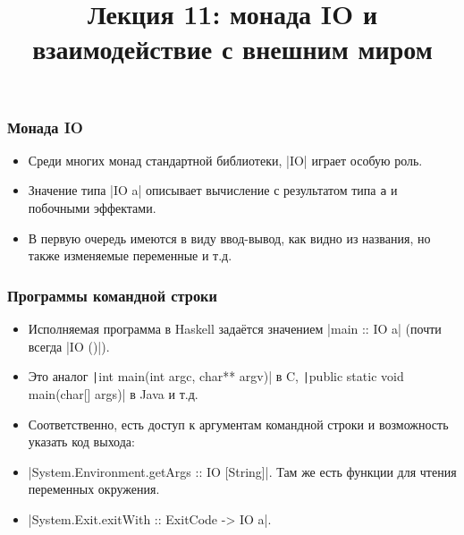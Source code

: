 \documentclass[11pt]{beamer}
\title{Лекция 11: монада IO и взаимодействие с внешним миром}
\begin{document}
\begin{frame}[plain]
  \maketitle
\end{frame}

\begin{frame}[fragile]
  \frametitle{Монада IO}
  \begin{itemize}
    \item Среди многих монад стандартной библиотеки, \haskinline|IO| играет особую роль.
    \item Значение типа \haskinline|IO a| описывает вычисление с результатом типа \lstinline|a| и побочными эффектами.
    \item В первую очередь имеются в виду ввод-вывод, как видно из названия, но также изменяемые переменные и т.д.
  \end{itemize}
\end{frame}

\begin{frame}[fragile]
  \frametitle{Программы командной строки}
  \begin{itemize}
    \item Исполняемая программа в Haskell задаётся значением
          \haskinline|main :: IO a| (почти всегда \haskinline|IO ()|).
    \item Это аналог \texttt|int main(int argc, char** argv)| в C, \texttt|public static void main(char[] args)| в Java и т.д.
    \item Соответственно, есть доступ к аргументам командной строки и возможность указать код выхода:
    \item \haskinline|System.Environment.getArgs :: IO [String]|. Там же есть функции для чтения переменных окружения.
    \item \haskinline|System.Exit.exitWith :: ExitCode -> IO a|.
  \end{itemize}
\end{frame}
\end{document}
